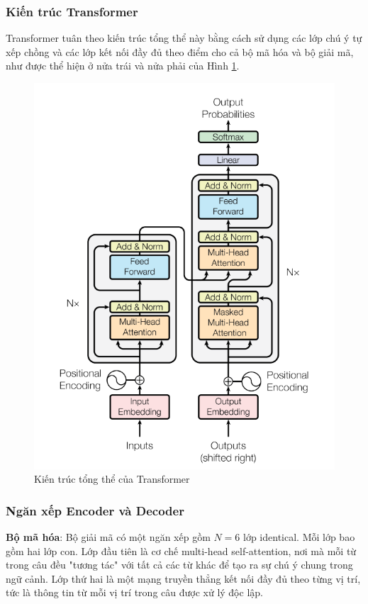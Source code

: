 \subsubsection*{Kiến trúc Transformer}
Transformer tuân theo kiến trúc tổng thể này bằng cách sử dụng các lớp chú ý tự xếp chồng và các lớp kết nối đầy đủ theo điểm cho cả bộ mã hóa và bộ giải mã, như được thể hiện ở nửa trái và nửa phải của Hình \ref{fig3}. 
\begin{figure}[h]
    \includegraphics[scale=0.65]{images/transformer-architecture.png}
    \centering
    \caption{Kiến trúc tổng thể của Transformer \cite{vaswani2023attention}}
    \label{fig3}
\end{figure}

\subsubsection*{Ngăn xếp Encoder và Decoder}
\textbf{Bộ mã hóa}: Bộ giải mã có một ngăn xếp gồm $N = 6$ lớp identical. Mỗi lớp bao gồm hai lớp con. Lớp đầu tiên là cơ chế  multi-head self-attention, nơi mà mỗi từ trong câu đều "tương tác" với tất cả các từ khác để tạo ra sự chú ý chung trong ngữ cảnh. Lớp thứ hai là một mạng truyền thẳng kết nối đầy đủ theo từng vị trí, tức là thông tin từ mỗi vị trí trong câu được xử lý độc lập.

